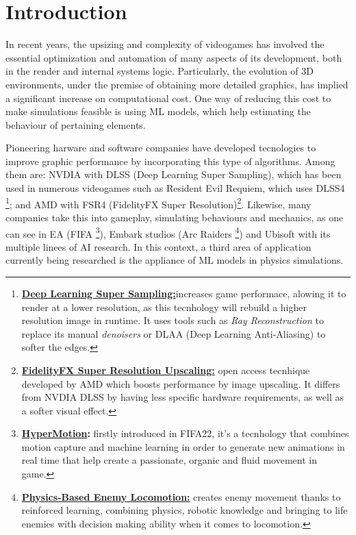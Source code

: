 \chapter*{Introduction}
\label{cap:introduction}
In recent years, the upsizing and complexity of videogames has involved the essential optimization and automation of many aspects of its development, both in the render and internal systems logic. Particularly, the evolution of 3D environments, under the premise of obtaining more detailed graphics, has implied a significant increase on computational cost. One way of reducing this cost to make simulations feasible is using ML models, which help estimating the behaviour of pertaining elements.

Pioneering harware and software companies have developed tecnologies to improve graphic performance by incorporating this type of algorithms. Among them are: NVDIA with DLSS (Deep Learning Super Sampling), which has been used in numerous videogames such as Resident Evil Requiem, which uses DLSS4 \footnote{ \textbf{\href{https://www.nvidia.com/es-la/geforce/news/dlss-4-rtx-path-tracing-game-announcements-ces-2026/}{Deep Learning Super Sampling:}}increases game performace, alowing it to render at a lower resolution, as this tecnhology will rebuild a higher resolution image in runtime. It uses tools such as  \textit{Ray Reconstruction} to replace its manual \textit{denoisers} or DLAA (Deep Learning Anti-Aliasing) to softer the edges.}; and AMD with FSR4 (FidelityFX Super Resolution)\footnote{ \textbf{\href{https://www.amd.com/en/products/graphics/technologies/fidelityfx/super-resolution.html}{FidelityFX Super Resolution Upscaling:}} open access tecnhique developed by AMD which boosts performance by image upscaling. It differs from NVDIA DLSS by having less specific hardware requirements, as well as a softer visual effect.}. Likewise, many companies take this into gameplay, simulating behaviours and mechanics, as one can see in EA (FIFA \footnote{\textbf{\href{https://news.ea.com/press-releases/press-releases-details/2021/EA-SPORTS-Introduces-FIFA-22-With-Next-Gen-HyperMotion-Technology-Bringing-Footballs-Most-Realistic-and-Immersive-Gameplay-Experience-to-Life/default.aspx}{HyperMotion}:} firstly introduced in FIFA22, it's a tecnhology that combines motion capture and machine learning in order to generate new animations in real time that help create a passionate, organic and fluid movement in game.}), Embark studios (Arc Raiders \footnote{\textbf{\href{https://schedule.gdconf.com/session/learning-to-move-physics-based-enemy-locomotion-in-arc-raiders/917319}{Physics-Based Enemy Locomotion:}} creates enemy movement thanks to reinforced learning, combining physics, robotic knowledge and bringing to life enemies with decision making ability when it comes to locomotion.}) and Ubisoft with its multiple linees of AI research. In this context, a third area of application currently being researched is the appliance of ML models in physics simulations.

